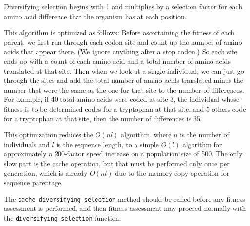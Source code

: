 \documentclass{article}
\begin{document}
	Diversifying selection begins with 1 and multiplies by a selection
	factor for each amino acid difference that the organism has at each
	position.

	This algorithm is optimized as follows: Before ascertaining the fitness
	of each parent, we first run through each codon site and count up the
	number of amino acids that appear there. (We ignore anything after a
	stop codon.) So each site ends up with a count of each amino acid and a
	total number of amino acids translated at that site. Then when we look
	at a single individual, we can just go through the sites and add the
	total number of amino acids translated minus the number that were the
	same as the one for that site to the number of differences. For example,
	if 40 total amino acids were coded at site 3, the individual whose
	fitness is to be determined codes for a tryptophan at that site, and 5
	others code for a tryptophan at that site, then the number of
	differences is 35.

	This optimization reduces the $O(nl)$ algorithm, where $n$ is the number
	of individuals and $l$ is the sequence length, to a simple $O(l)$
	algorithm for approximately a 200-factor speed increase on a population
	size of 500. The only slow part is the cache operation, but that must be
	performed only once per generation, which is already $O(nl)$ due to the
	memory copy operation for sequence parentage.

	The \verb|cache_diversifying_selection| method should be called before
	any fitness assessment is performed, and then fitness assessment may
	proceed normally with the \verb|diversifying_selection| function.
\end{document}
